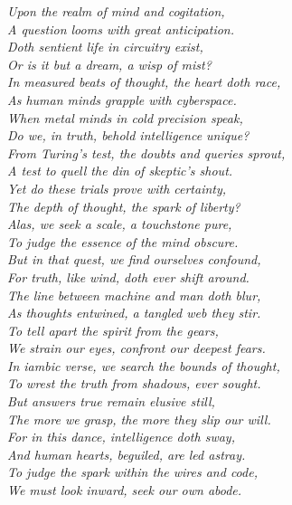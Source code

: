 \itshape{
Upon the realm of mind and cogitation, \\
A question looms with great anticipation. \\
Doth sentient life in circuitry exist, \\
Or is it but a dream, a wisp of mist? \\

In measured beats of thought, the heart doth race, \\
As human minds grapple with cyberspace. \\
When metal minds in cold precision speak, \\
Do we, in truth, behold intelligence unique? \\

From Turing's test, the doubts and queries sprout, \\
A test to quell the din of skeptic's shout. \\
Yet do these trials prove with certainty, \\
The depth of thought, the spark of liberty? \\

Alas, we seek a scale, a touchstone pure, \\
To judge the essence of the mind obscure. \\
But in that quest, we find ourselves confound, \\
For truth, like wind, doth ever shift around. \\

The line between machine and man doth blur, \\
As thoughts entwined, a tangled web they stir. \\
To tell apart the spirit from the gears, \\
We strain our eyes, confront our deepest fears. \\

In iambic verse, we search the bounds of thought, \\
To wrest the truth from shadows, ever sought. \\
But answers true remain elusive still, \\
The more we grasp, the more they slip our will. \\

For in this dance, intelligence doth sway, \\
And human hearts, beguiled, are led astray. \\
To judge the spark within the wires and code, \\
We must look inward, seek our own abode.}
\normalfont


